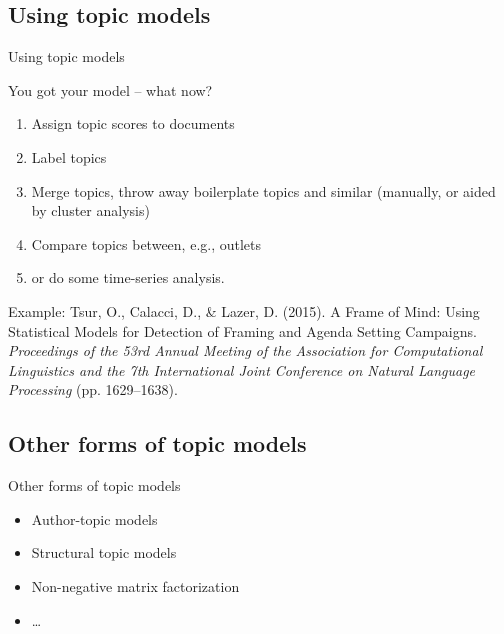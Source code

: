 \documentclass[handout]{beamer}
\begin{document}


\subsection{Using topic models}

\begin{frame}{Using topic models}
	
	You got your model -- what now?
	
	\begin{enumerate}
		\item Assign topic scores to documents
		\item Label topics
		\item Merge topics, throw away boilerplate topics and similar (manually, or aided by cluster analysis)
		\item Compare topics between, e.g., outlets
		\item or do some time-series analysis.
	\end{enumerate}
	
	
	Example:
	\tiny{Tsur, O., Calacci, D., \& Lazer, D. (2015). A Frame of Mind: Using Statistical Models for Detection of Framing and Agenda Setting Campaigns. \textit{Proceedings of the 53rd Annual Meeting of the Association for Computational Linguistics and the 7th International Joint Conference on Natural Language Processing} (pp. 1629–1638).}
	
	
	
\end{frame}



\subsection{Other forms of topic models}

\begin{frame}{Other forms of topic models}
	\begin{itemize}
		\item Author-topic models
		\item Structural topic models
		\item Non-negative matrix factorization
		\item \ldots
	\end{itemize}
\end{frame}
\end{document}
